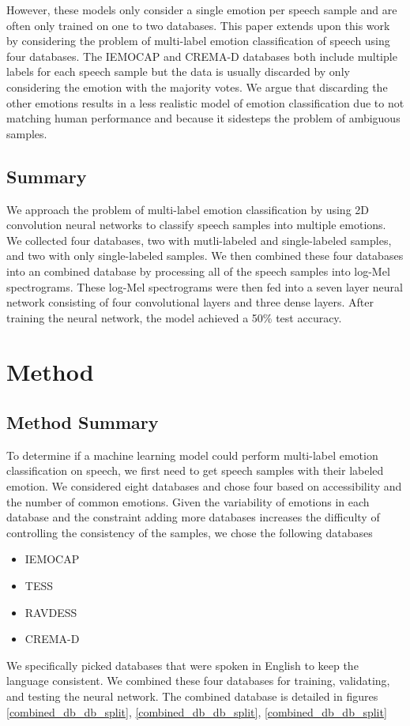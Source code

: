 \documentclass[conference]{IEEEtran}
\begin{document}
However, these models only consider a single emotion per speech sample and are often only trained on one to two databases. This paper extends upon this work by considering the problem of multi-label emotion classification of speech using four databases. The IEMOCAP and CREMA-D databases both include multiple labels for each speech sample but the data is usually discarded by only considering the emotion with the majority votes. We argue that discarding the other emotions results in a less realistic model of emotion classification due to not matching human performance and because it sidesteps the problem of ambiguous samples.

\subsection{Summary}

We approach the problem of multi-label emotion classification by using 2D convolution neural networks to classify speech samples into multiple emotions. We collected four databases, two with mutli-labeled and single-labeled samples, and two with only single-labeled samples. We then combined these four databases into an combined database by processing all of the speech samples into log-Mel spectrograms. These log-Mel spectrograms were then fed into a seven layer neural network consisting of four convolutional layers and three dense layers. After training the neural network, the model achieved a 50\% test accuracy.

\section{Method}

\subsection{Method Summary}

To determine if a machine learning model could perform multi-label emotion classification on speech, we first need to get speech samples with their labeled emotion. We considered eight databases and chose four based on accessibility and the number of common emotions. Given the variability of emotions in each database and the constraint adding more databases increases the difficulty of controlling the consistency of the samples, we chose the following databases
\begin{itemize}
	\item IEMOCAP \cite{busso_2008}
	\item TESS \cite{dupuis_2011}
	\item RAVDESS \cite{livingstone_2018}
	\item CREMA-D \cite{cao_2014}
\end{itemize}
We specifically picked databases that were spoken in English to keep the language consistent. We combined these four databases for training, validating, and testing the neural network. The combined database is detailed in figures \ref{combined_db_db_split}, \ref{combined_db_db_split}, \ref{combined_db_db_split}
\end{document}
